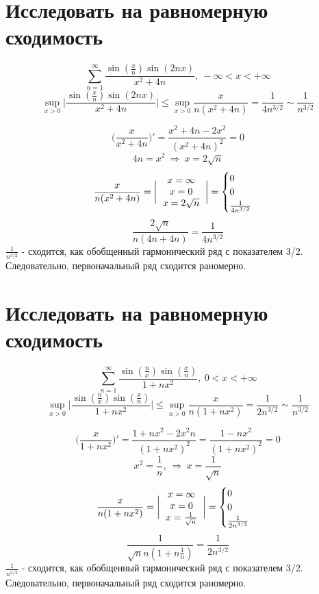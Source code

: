 \documentclass{article}
\begin{document}
\section{Исследовать на равномерную сходимость}
\[
    \sum\limits_{n=1}^{\infty}\frac{\sin(\frac{x}{n}) \sin(2nx)}{x^2+4n}, \ -\infty < x < +\infty
\]
\[
       \sup\limits_{x>0}\bigg|\frac{\sin(\frac{x}{n}) \sin(2nx)}{x^2+4n} \bigg| \le \sup\limits_{x>0} \frac{x}{n(x^2+4n)} = \frac{1}{4n^{3/2}} \sim \frac{1}{n^{3/2}}
\]


\[
    \bigg( \frac{x}{x^2+4n}\bigg)' = \frac{x^2+4n-2x^2}{(x^2+4n)^2} = 0
\]
\[
    4n = x^2 \ \Rightarrow \ x = 2\sqrt{n}
\]
\[
     \frac{x}{n(x^2+4n)} = \bigg| \begin{tabular}{ c }
        $x=\infty$  \\ 
        $x=0$  \\  
        $x=2\sqrt{n}$     
       \end{tabular} \bigg| = \begin{cases}
        0 \\
        0 \\
        \frac{1}{4n^{3/2}}
       \end{cases}
\]
\[
       \frac{2\sqrt{n}}{n(4n+4n)} = \frac{1}{4n^{3/2}}
\]
$\frac{1}{n^{3/2}}$ - сходится, как обобщенный гармонический ряд с показателем 3/2. Следовательно, первоначальный ряд сходится раномерно.


\section{Исследовать на равномерную сходимость}
\[
    \sum\limits_{n=1}^\infty\frac{\sin(\frac{n}{x})\sin(\frac{x}{n})}{1+nx^2},  \ 0 < x < +\infty
\]
\[
    \sup\limits_{x>0}\bigg| \frac{\sin(\frac{n}{x})\sin(\frac{x}{n})}{1+nx^2} \bigg| \le \sup\limits_{n>0} \frac{x}{n(1+nx^2)} = \frac{1}{2n^{3/2}} \sim \frac{1}{n^{3/2}}
\]


\[
    \bigg( \frac{x}{1+nx^2}\bigg)' = \frac{1+nx^2 -2x^2n}{(1+nx^2)^2} = \frac{1 - nx^2}{(1+nx^2)^2}=0
\]
\[
    x^2 =\frac{1}{n}, \ \Rightarrow  \ x=\frac{1}{\sqrt{n}}
\]
\[
     \frac{x}{n(1+nx^2)} = \bigg| \begin{tabular}{ c }
        $x=\infty$  \\ 
        $x=0$  \\  
        $x=\frac{1}{\sqrt{n}}$     
       \end{tabular} \bigg| = \begin{cases}
        0 \\
        0 \\
         \frac{1}{2n^{3/2}}
       \end{cases}
\]
\[
        \frac{1}{\sqrt{n}n(1+n\frac{1}{n})} = \frac{1}{2n^{3/2}}
\]
$\frac{1}{n^{3/2}}$ - сходится, как обобщенный гармонический ряд с показателем 3/2. Следовательно, первоначальный ряд сходится раномерно.
\end{document}
